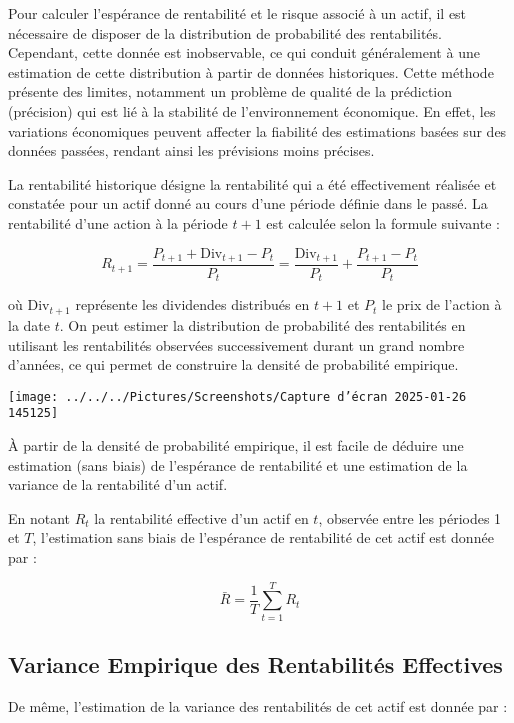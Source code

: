 \documentclass[a4paper, 12pt]{report}
\begin{document}
Pour calculer l'espérance de rentabilité et le risque associé à un actif, il est nécessaire de disposer de la distribution de probabilité des rentabilités. Cependant, cette donnée est inobservable, ce qui conduit généralement à une estimation de cette distribution à partir de données historiques. Cette méthode présente des limites, notamment un problème de qualité de la prédiction (précision) qui est lié à la stabilité de l'environnement économique. En effet, les variations économiques peuvent affecter la fiabilité des estimations basées sur des données passées, rendant ainsi les prévisions moins précises.

La rentabilité historique désigne la rentabilité qui a été effectivement réalisée et constatée pour un actif donné au cours d'une période définie dans le passé. La rentabilité d'une action à la période \( t + 1 \) est calculée selon la formule suivante :

\[
R_{t+1} = \frac{P_{t+1} + \text{Div}_{t+1} - P_t}{P_t} = \frac{\text{Div}_{t+1}}{P_t} + \frac{P_{t+1} - P_t}{P_t}
\]

où \( \text{Div}_{t+1} \) représente les dividendes distribués en \( t + 1 \) et \( P_t \) le prix de l'action à la date \( t \). On peut estimer la distribution de probabilité des rentabilités en utilisant les rentabilités observées successivement durant un grand nombre d'années, ce qui permet de construire la densité de probabilité empirique.

\begin{center}
	\texttt{[image: ../../../Pictures/Screenshots/Capture d'écran 2025-01-26 145125]}
\end{center}

À partir de la densité de probabilité empirique, il est facile de déduire une estimation (sans biais) de l'espérance de rentabilité et une estimation de la variance de la rentabilité d'un actif.


En notant \( R_t \) la rentabilité effective d'un actif en \( t \), observée entre les périodes 1 et \( T \), l'estimation sans biais de l'espérance de rentabilité de cet actif est donnée par :

\[
\bar{R} = \frac{1}{T} \sum_{t=1}^{T} R_t 
\]

\subsection*{Variance Empirique des Rentabilités Effectives}

De même, l'estimation de la variance des rentabilités de cet actif est donnée par :
\end{document}
